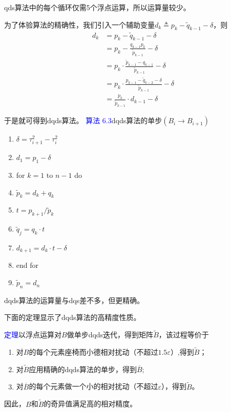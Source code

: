 \documentclass[12pt,a4paper]{article}
\begin{document}
qds算法中的每个循环仅需5个浮点运算，所以运算量较少。

为了体验算法的精确性，我们引入一个辅助变量$d_{k} \triangleq p_{k}-\tilde{q}_{k-1}-\delta$，则
$$
\begin{aligned} d_{k} &=p_{k}-\tilde{q}_{k-1}-\delta \\ &=p_{k}-\frac{q_{k-1} p_{k}}{\tilde{p}_{k-1}}-\delta \\ &=p_{k} \cdot \frac{\tilde{p}_{k-1}-q_{k-1}}{\tilde{p}_{k-1}}-\delta \\ &=p_{k} \cdot \frac{p_{k-1}-\tilde{q}_{k-2}-\delta}{\tilde{p}_{k-1}}-\delta \\ &=\frac{p_{k}}{\tilde{p}_{k-1}} \cdot d_{k-1}-\delta \end{aligned}
$$

于是就可得到dqds算法。
\textcolor{blue}{算法 6.3}\quad dqds算法的单步$\left(B_{i} \rightarrow B_{i+1}\right)$
\begin{enumerate}[1:]
	\item $\delta=\tau_{i+1}^{2}-\tau_{i}^{2}$
	\item $d_{1}=p_{1}-\delta$
	\item for $k=1$ to $n-1$ do
	\item \quad $\tilde{p}_{k}=d_{k}+q_{k}$
	\item \quad $t=p_{k+1} / \tilde{p}_{k}$
	\item \quad $\tilde{q}_{j}=q_{k} \cdot t$
	\item \quad $d_{k+1}=d_{k} \cdot t-\delta$
	\item end for 
	\item $\tilde{p}_{n}=d_{n}$
\end{enumerate}

dqds算法的运算量与dqs差不多，但更精确。

下面的定理显示了dqds算法的高精度性质。

\textcolor{blue}{定理}\quad 以浮点运算对$B$做单步dqds迭代，得到矩阵$\tilde{B}$，该过程等价于
\begin{enumerate}[1.]
	\item 对$B$的每个元素座椅而小德相对扰动（不超过$1.5\varepsilon$）,得到$\tilde{B}$；
	\item 对$\tilde{B}$应用精确的dqds算法的单步，得到$\overline{B}$;
	\item 对$\overline{B}$的每个元素做一个小的相对扰动（不超过$\varepsilon$），得到$\tilde{B}$。
\end{enumerate}

因此，$B$和$\tilde{B}$的奇异值满足高的相对精度。
\end{document}
